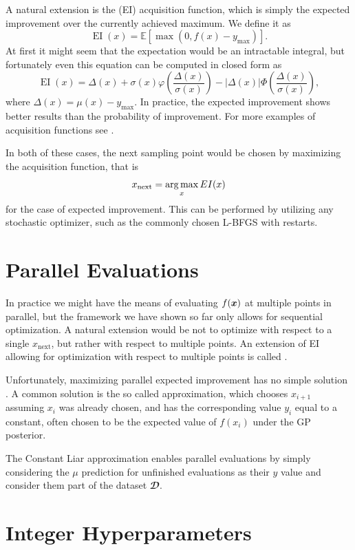A natural extension is the  (EI) acquisition function,
which is simply the expected improvement over the currently achieved maximum.
We define it as $$\operatorname{EI}(x) = 𝔼[\max(0, f(x) - y_{\max})].$$ At first it might seem that
the expectation would be an intractable integral, but fortunately even this
equation can be computed in closed form as
$$
\operatorname{EI}(x) = Δ(x) + σ(x) φ \left( \frac{Δ(x)}{σ(x)} \right) - |Δ(x)| Φ \left( \frac{Δ(x)}{σ(x)} \right),
$$
where $Δ(x) = μ(x) - y_{\max}$. In practice, the expected improvement shows better results
than the probability of improvement. For more examples of acquisition functions see
\cite{frazier2018tutorial}.

In both of these cases, the next sampling point would be chosen by maximizing
the acquisition function, that is $$x_{\operatorname{next}} = \operatorname*{arg\,max}_x EI(x)$$ for
the case of expected improvement. This can be performed by utilizing any stochastic optimizer,
such as the commonly chosen L-BFGS with restarts.


\section{Parallel Evaluations}
\label{section:parallel-evaluations}

In practice we might have the means of evaluating $f({\boldsymbol{x}})$ at multiple points
in parallel, but the framework we have shown so far only allows for sequential
optimization. A natural extension would be not to optimize with respect
to a single $x_{\operatorname{next}}$, but rather with respect to multiple points. An extension
of EI allowing for optimization with respect to multiple points is called .

Unfortunately, maximizing parallel expected improvement has no simple solution \citep{frazier2018tutorial}. A
common solution is the so called  approximation, which
chooses $x_{i+1}$ assuming $x_i$ was already chosen, and has the corresponding
value $y_i$ equal to a constant, often chosen to be the expected value of
$f(x_i)$ under the GP posterior.

The Constant Liar approximation enables parallel evaluations by simply
considering the $μ$ prediction for unfinished evaluations as their $y$ value
and consider them part of the dataset $𝓓$.


\section{Integer Hyperparameters}


